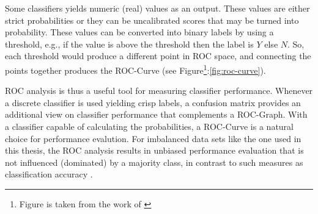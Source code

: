 Some classifiers yields numeric (real) values as an output. These values are either strict probabilities or they can be uncalibrated scores that may be turned into probability. These values can be converted into binary labels by using a threshold, e.g., if the value is above the threshold then the label is \(Y\) else \(N\). So, each threshold would produce a different point in ROC space, and connecting the points together produces the ROC-Curve (see Figure\footnote{Figure is taken from the work of \cite{Fawcett:2006:IRA:1159473.1159475}}:\ref{fig:roc-curve}). 

ROC analysis is thus a useful tool for measuring classifier performance. Whenever a discrete classifier is used yielding crisp labels, a confusion matrix provides an additional view on classifier performance that complements a ROC-Graph. With a classifier capable of calculating the probabilities, a ROC-Curve is a natural choice for performance evalution. For imbalanced data sets like the one used in this thesis, the ROC analysis results in unbiased performance evaluation that is not influenced (dominated) by a majority class, in contrast to such measures as classification accuracy  \cite{Fawcett:2006:IRA:1159473.1159475}.

 









